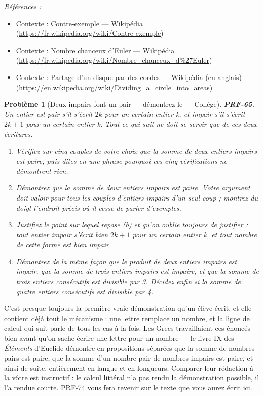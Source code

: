 \documentclass[11pt]{article}
\newtheorem{problem}{Problème}
\newenvironment{refs}{\par\small\noindent\emph{Références :}\begin{itemize}\setlength\itemsep{0pt}}{\end{itemize}\normalsize}
\begin{document}
\begin{refs}
\item Contexte : Contre-exemple --- Wikipédia (\url{https://fr.wikipedia.org/wiki/Contre-exemple})
\item Contexte : Nombre chanceux d'Euler --- Wikipédia (\url{https://fr.wikipedia.org/wiki/Nombre_chanceux_d%27Euler})
\item Contexte : Partage d'un disque par des cordes --- Wikipédia (en anglais) (\url{https://en.wikipedia.org/wiki/Dividing_a_circle_into_areas})
\end{refs}

\bigskip

\begin{problem}[{Deux impairs font un pair --- démontrez-le --- Collège}]
\textbf{PRF-65.} Un entier est pair s'il s'écrit $ 2k $ pour un certain entier k, et
impair s'il s'écrit $ 2k+1 $ pour un certain entier k. Tout ce qui suit ne doit se servir
que de ces deux écritures.
\begin{enumerate}
\item[(a)] Vérifiez sur cinq couples de votre choix que la somme de deux entiers impairs est
paire, puis dites en une phrase pourquoi ces cinq vérifications ne démontrent rien.
\item[(b)] Démontrez que la somme de deux entiers impairs est paire. Votre argument doit valoir
pour tous les couples d'entiers impairs d'un seul coup ; montrez du doigt l'endroit précis
où il cesse de parler d'exemples.
\item[(c)] Justifiez le point sur lequel repose (b) et qu'on oublie toujours de justifier : tout
entier impair s'écrit bien $ 2k+1 $ pour un certain entier k, et tout nombre de cette
forme est bien impair.
\item[(d)] Démontrez de la même façon que le produit de deux entiers impairs est impair, que la
somme de trois entiers impairs est impaire, et que la somme de trois entiers consécutifs est
divisible par 3. Décidez enfin si la somme de quatre entiers consécutifs est divisible
par 4.
\end{enumerate}

\end{problem}

\noindent C'est presque toujours la première vraie démonstration qu'un élève écrit,
et elle contient déjà tout le mécanisme : une lettre remplace un nombre, et la ligne de
calcul qui suit parle de tous les cas à la fois. Les Grecs travaillaient ces énoncés bien
avant qu'on sache écrire une lettre pour un nombre --- le livre IX des \textit{Éléments}
d'Euclide démontre en propositions séparées que la somme de nombres pairs est paire, que la
somme d'un nombre pair de nombres impairs est paire, et ainsi de suite, entièrement en
langue et en longueurs. Comparer leur rédaction à la vôtre est instructif : le calcul
littéral n'a pas rendu la démonstration possible, il l'a rendue courte. PRF-74 vous fera
revenir sur le texte que vous aurez écrit ici.
\end{document}
